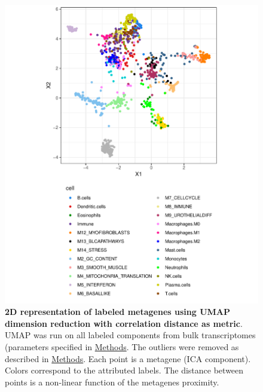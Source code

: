 \documentclass[12pt,]{book}
\theoremstyle{definition}
\theoremstyle{definition}
\theoremstyle{definition}
\theoremstyle{remark}
\begin{document}
\begin{figure}

{\centering \includegraphics[width=0.9\linewidth]{figures-ext/umap_plot_cleaned} 

}

\caption[2D representation of labelled metagenes]{\textbf{2D representation of labeled
metagenes using UMAP dimension reduction with correlation distance as
metric}. UMAP was run on all labeled components from bulk transcriptomes
(parameters specified in \protect\hyperlink{methods-1}{Methods}. The
outliers were removed as described in
\protect\hyperlink{methods-1}{Methods}. Each point is a metagene (ICA
component). Colors correspond to the attributed labels. The distance
between points is a non-linear function of the metagenes proximity.}\label{fig:umapplotclean}
\end{figure}
\end{document}
